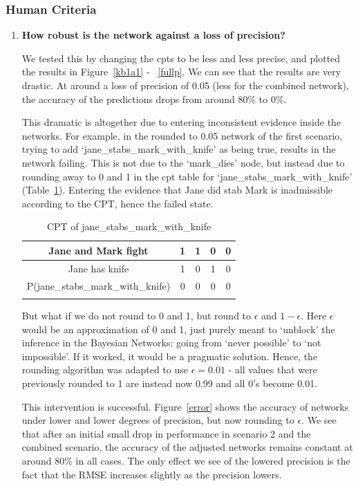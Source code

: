 \subsubsection{Human Criteria}
\begin{enumerate}


\item \textbf{How robust is the network against a loss of precision?}

We tested this by changing the cpts to be less and less precise, and plotted the results in Figure~\ref{kb1a1} - ~\ref{fullp}. We can see that the results are very drastic. At around a loss of precision of 0.05 (less for the combined network), the accuracy of the predictions drops from around 80\% to 0\%. 

This dramatic is altogether due to entering inconsistent evidence inside the networks. For example, in the rounded to 0.05 network of the first scenario, trying to add `jane\_stabs\_mark\_with\_knife' as being true, results in the network failing. This is not due to the `mark\_dies' node, but instead due to rounding away to 0 and 1 in the cpt table for `jane\_stabs\_mark\_with\_knife' (Table~\ref{stab}). Entering the evidence that Jane did stab Mark is inadmissible according to the CPT, hence the failed state.

\begin{table}
\begin{center}
\begin{tabular}{|c|c|c|c|c|}
 \hline
 Jane and Mark fight & 1 & 1 &0 & 0 \\
 \hline
 Jane has knife & 1 & 0 &1 & 0 \\
 \hline
 \hline
  P(jane\_stabs\_mark\_with\_knife) & 0 & 0 &0 & 0 \\
  \hline
\label{stab}
\end{tabular}
\caption{CPT of jane\_stabs\_mark\_with\_knife}
\end{center}
\end{table}

But what if we do not round to 0 and 1, but round to $\epsilon$ and $1 - \epsilon$. Here $\epsilon$ would be an approximation of 0 and 1, just purely meant to `unblock' the inference in the Bayesian Networks: going from `never possible' to `not impossible'. If it worked, it would be a pragmatic solution. Hence, the rounding algorithm was adapted to use $\epsilon = 0.01$ - all values that were previously rounded to 1 are instead now 0.99 and all 0's become 0.01.

This intervention is successful. Figure~\ref{error} shows the accuracy of networks under lower and lower degrees of precision, but now rounding to $\epsilon$. We see that after an initial small drop in performance in scenario 2 and the combined scenario, the accuracy of the adjusted networks remains constant at around 80\% in all cases. The only effect we see of the lowered precision is the fact that the RMSE increases slightly as the precision lowers.


\end{enumerate}
